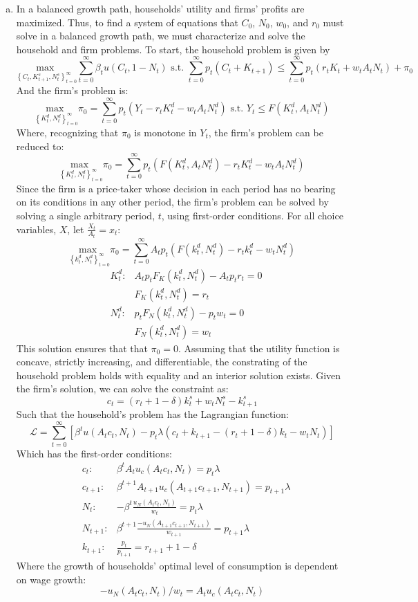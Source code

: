 \documentclass{article}
\newcommand{\usmax}[1]{\underset{#1}{\text{max }}}
\renewcommand{\L}{\mathcal{L}}
\newcommand{\zinf}{_{t=0}^\infty}
\begin{document}
\begin{enumerate}[(a)]
	\item In a balanced growth path, households' utility and firms' profits are maximized. Thus, to find a system of equations that $C_0$, $N_0$, $w_0$, and $r_0$ must solve in a balanced growth path, we must characterize and solve the household and firm problems. To start, the household problem is given by 
		\[
			\usmax{\left\{C_t,K^s_{t+1},N^s_t\right\}_{t=0}^\infty}\sum_{t=0}^\infty \beta_t u(C_t,1-N_t)\text{ s.t. }
				\sum_{t=0}^\infty p_t\left(C_t + K_{t+1}\right) \leq \sum_{t=0}^\infty p_t\left(r_tK_t + w_tA_tN_t\right) + \pi_0
		\]
		And the firm's problem is:
		\[
			\usmax{\left\{K_t^d,N_t^d\right\}_{t=0}^\infty}\pi_0 = \sum\zinf p_t\left(Y_t-r_tK_t^d - w_tA_tN_t^d\right)\text{ s.t. } Y_t\leq F(K_t^d,A_tN_t^d)
		\]
		Where, recognizing that $\pi_0$ is monotone in $Y_t$, the firm's problem can be reduced to:
		\[
			\usmax{\left\{K_t^d,N_t^d\right\}_{t=0}^\infty}\pi_0 = \sum\zinf p_t\left(F(K_t^d,A_tN_t^d)-r_tK_t^d - w_tA_tN_t^d\right)
		\]
		Since the firm is a price-taker whose decision in each period has no bearing on its conditions in any other period, the firm's problem can be solved by solving a single arbitrary period, $t$, using first-order conditions. For all choice variables, $X$, let ${\frac{X_t}{A_t} = x_t}$:
		\[
			\usmax{\left\{k_t^d,N_t^d\right\}_{t=0}^\infty}\pi_0 = \sum\zinf A_tp_t\left(F(k_t^d,N_t^d)-r_tk_t^d - w_tN_t^d\right)
		\]
		\begin{align*}
			&K_t^d: & A_tp_tF_K(k_t^d,N_t^d) -A_tp_tr_t = 0	\\
			&		& F_K(k_t^d,N_t^d) = r_t				\\
			&N_t^d:	& p_tF_N(k_t^d,N_t^d) -p_tw_t = 0	\\
			&		& F_N(k_t^d,N_t^d) = w_t
		\end{align*}
		This solution ensures that that $\pi_0=0$. Assuming that the utility function is concave, strictly increasing, and differentiable, the constrating of the household problem holds with equality and an interior solution exists. Given the firm's solution, we can solve the constraint as:
		\[
				c_t = (r_t+1-\delta)k^s_t + w_tN^s_t - k^s_{t+1}
		\]
		Such that the household's problem has the Lagrangian function:
		\[
			\L = \sum\zinf\left[\beta^tu(A_tc_t,N_t) - p_t\lambda\left(c_t + k_{t+1} - (r_t+1-\delta)k_t - w_tN_t\right)\right]
		\]
		Which has the first-order conditions:
		\begin{align*}
			&c_t: 			& \beta^tA_tu_c(A_tc_t,N_t) = 	p_t\lambda 									\\
			&c_{t+1}:		& \beta^{t+1}A_{t+1}u_c(A_{t+1}c_{t+1},N_{t+1}) = 	p_{t+1}\lambda 			\\
			&N_t:			& -\beta^t\frac{u_N(A_tc_t,N_t)}{w_t} = p_t\lambda							\\
			&N_{t+1}:		& \beta^{t+1}\frac{-u_N(A_{t+1}c_{t+1},N_{t+1})}{w_{t+1}} = p_{t+1}\lambda	\\
			&k_{t+1}:		& \frac{p_t}{p_{t+1}} = r_{t+1} + 1 - \delta
		\end{align*}
		Where the growth of households' optimal level of consumption is dependent on wage growth:
		\[
			-u_N(A_tc_t,N_t)/w_t = A_tu_c(A_tc_t,N_t) 
		\]
		

\end{enumerate}
\end{document}
